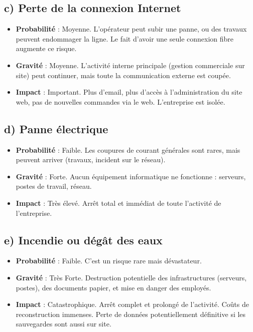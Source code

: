 \documentclass[a4paper,10pt]{article}
\newcommand{\notion}[1]{\textbf{\textcolor{mainBlue}{#1}}}
\newcommand{\definition}[1]{\textbf{\textcolor{softTeal}{#1}}}
\begin{document}
\begin{tcolorbox}[title=2) Identifier les risques majeurs]
    \subsection*{c) Perte de la connexion Internet}
    \begin{itemize}[leftmargin=*]
        \item \definition{Probabilité} : Moyenne. L'opérateur peut subir une panne, ou des travaux peuvent endommager la ligne. Le fait d'avoir une seule connexion fibre augmente ce risque.
        \item \definition{Gravité} : Moyenne. L'activité interne principale (gestion commerciale sur site) peut continuer, mais toute la communication externe est coupée.
        \item \notion{Impact} : Important. Plus d'email, plus d'accès à l'administration du site web, pas de nouvelles commandes via le web. L'entreprise est isolée.
    \end{itemize}

    \subsection*{d) Panne électrique}
    \begin{itemize}[leftmargin=*]
        \item \definition{Probabilité} : Faible. Les coupures de courant générales sont rares, mais peuvent arriver (travaux, incident sur le réseau).
        \item \definition{Gravité} : Forte. Aucun équipement informatique ne fonctionne : serveurs, postes de travail, réseau.
        \item \notion{Impact} : Très élevé. Arrêt total et immédiat de toute l'activité de l'entreprise.
    \end{itemize}

    \subsection*{e) Incendie ou dégât des eaux}
    \begin{itemize}[leftmargin=*]
        \item \definition{Probabilité} : Faible. C'est un risque rare mais dévastateur.
        \item \definition{Gravité} : Très Forte. Destruction potentielle des infrastructures (serveurs, postes), des documents papier, et mise en danger des employés.
        \item \notion{Impact} : Catastrophique. Arrêt complet et prolongé de l'activité. Coûts de reconstruction immenses. Perte de données potentiellement définitive si les sauvegardes sont aussi sur site.
    \end{itemize}
\end{tcolorbox}
\end{document}

